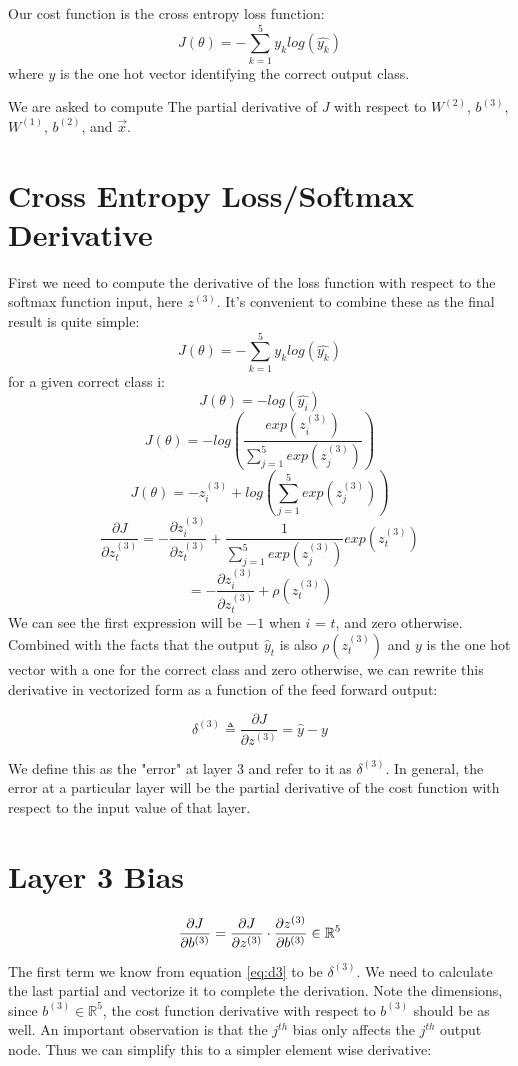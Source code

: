 \documentclass[]{article}
\newcommand{\deriv}[2]{%
	\ensuremath{\frac{\partial {#1}}{\partial {#2}}}}
\newcommand{\vlayer}[2]{ %
	\ensuremath{{#1}^{(#2)}}}
\newcommand{\reals}[1]{ %
	\ensuremath{\in \mathbb{R}^{#1}}}
\begin{document}
Our cost function is the cross entropy loss function:
$$J(\theta) = - \sum_{k=1}^{5} y_k log(\hat{y_k})$$
where $y$ is the one hot vector identifying the correct output class.

We are asked to compute The partial derivative of $J$ with respect to $W^{(2)}$, $b^{(3)}$, $W^{(1)}$, $b^{(2)}$, and $\vec{x}$.

\section{Cross Entropy Loss/Softmax Derivative}
First we need to compute the derivative of the loss function with respect to the softmax function input, here $z^{(3)}$. It's convenient to combine these as the final result is quite simple:
$$J(\theta) = - \sum_{k=1}^{5} y_k log(\hat{y_k})$$
for a given correct class i:
$$J(\theta) = - log(\hat{y_i})$$
$$J(\theta)= - log( \frac{exp(z^{(3)}_i)} {\sum_{j=1}^5 exp(z^{(3)}_j)} )$$
$$J(\theta)= -z^{(3)}_i + log({\sum_{j=1}^5 exp(z^{(3)}_j)})$$
$$\frac{\partial{J}}{\partial{z^{(3)}_t}} = -\frac{\partial{z^{(3)}_i}}{\partial{z^{(3)}_t}} + \frac{1}{\sum_{j=1}^5 exp(z^{(3)}_j)}exp(z^{(3)}_t)$$
$$ = -\frac{\partial{z^{(3)}_i}}{\partial{z^{(3)}_t}} + \rho(z^{(3)}_t)$$
We can see the first expression will be $-1$ when $i$ = $t$, and zero otherwise. Combined with the facts that the output $\hat y_t$ is also $\rho(z^{(3)}_t)$ and $y$ is the one hot vector with a one for the correct class and zero otherwise, we can rewrite this derivative in vectorized form as a function of the feed forward output:

\begin{equation} \label{eq:d3}
\delta^{(3)} \triangleq \frac{\partial{J}}{\partial{z^{(3)}}} = \hat y - y 
\end{equation}

We define this as the "error" at layer 3 and refer to it as $\delta^{(3)}$. In general, the error at a particular layer will be the partial derivative of the cost function with respect to the input value of that layer. 

\section{Layer 3 Bias}

$$ \deriv{J}{\vlayer{b}{3}} = \deriv{J}{\vlayer{z}{3}} \cdot \deriv{\vlayer{z}{3}}{\vlayer{b}{3}} \in \mathbb{R}^5$$

The first term we know from equation \ref{eq:d3} to be $\delta^{(3)}$. We need to calculate the last partial and vectorize it to complete the derivation. Note the dimensions, since $b^{(3)} \reals{5}$, the cost function derivative with respect to\vlayer{b}{3} should be as well. An important observation is that the $j^{th}$ bias only affects the $j^{th}$ output node. Thus we can simplify this to a simpler element wise derivative:
\end{document}

